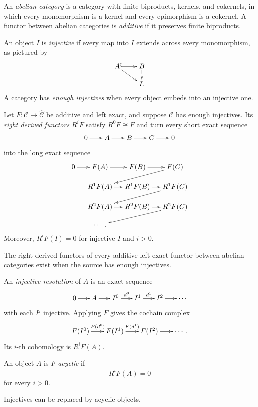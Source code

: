 \begin{definition}
\label{at-definition-abelian-derived-functor}
An \emph{abelian category} is a category with
finite biproducts, kernels, and cokernels, in
which every monomorphism is a kernel and
every
epimorphism is a cokernel.  A functor between
abelian categories is \emph{additive} if it
preserves finite biproducts.

An object $I$ is \emph{injective} if every
map into $I$ extends across every
monomorphism, as pictured by
$$
\xymatrix@C=22pt@R=13pt{
A\ar@{^{(}->}[r]\ar[dr]&B\ar@{-->}[d]\\
&I.
}
$$
A category has \emph{enough injectives} when
every object embeds into an injective one.

Let $F:\mathcal{C}\longrightarrow
\widehat{\mathcal{C}}$ be additive and left
exact, and suppose $\mathcal{C}$ has enough
injectives.  Its \emph{right derived
functors} $R^iF$ satisfy $R^0F\cong F$ and
turn every short exact sequence
$$
\xymatrix@C=18pt{
0\ar[r]&A\ar[r]&B\ar[r]&C\ar[r]&0
}
$$
into the long exact sequence
$$
\xymatrix@C=12pt@R=12pt{
0\ar[r]&F(A)\ar[r]&F(B)\ar[r]&F(C)
\ar[dll]\\
&R^1F(A)\ar[r]&R^1F(B)\ar[r]&
R^1F(C)\ar[dll]\\
&R^2F(A)\ar[r]&R^2F(B)\ar[r]&
R^2F(C)\ar[dll]\\
&\cdots .&&
}
$$
Moreover, $R^iF(I)=0$ for injective $I$ and
$i>0$.
\end{definition}

\begin{proposition}
\label{at-proposition-derived-functors-exist}
The right derived functors of every additive
left-exact functor between abelian categories
exist when the source has enough injectives.
\end{proposition}

An \emph{injective resolution} of $A$ is an
exact sequence
$$
\xymatrix@C=16pt{
0\ar[r]&A\ar[r]&I^0\ar[r]^{d^0}&
I^1\ar[r]^{d^1}&I^2\ar[r]&\cdots
}
$$
with each $I^j$ injective.  Applying $F$
gives the cochain complex
$$
\xymatrix@C=18pt{
F(I^0)\ar[r]^{F(d^0)}&
F(I^1)\ar[r]^{F(d^1)}&
F(I^2)\ar[r]&\cdots .
}
$$
Its $i$-th cohomology is $R^iF(A)$.

\begin{definition}
\label{at-definition-f-acyclic-object}
An object $A$ is \emph{$F$-acyclic} if
$$
R^iF(A)=0
$$
for every $i>0$.
\end{definition}

Injectives can be replaced by acyclic
objects.

